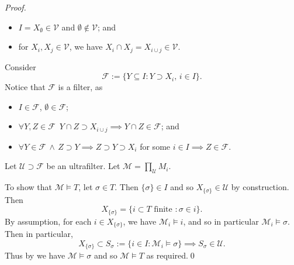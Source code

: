 \documentclass[notoc,notitlepage]{tufte-book}
\begin{document}
\begin{proof}
{\begin{itemize}
    \item $I = X_\emptyset \in \mathcal{V}$ and $\emptyset \notin \mathcal{V}$; and
    \item for $X_i, X_j \in \mathcal{V}$, we have $X_i \cap X_j = X_{i \cup j} \in \mathcal{V}$.
  \end{itemize}
  }
  Consider
  \begin{equation*}
    \mathcal{F} := \{ Y \subseteq I : Y \supset X_i, \, i \in I \}.
  \end{equation*}
  Notice that $\mathcal{F}$ is a filter, as
  \begin{itemize}
    \item $I \in \mathcal{F}$, $\emptyset \in \mathcal{F}$;
    \item $\forall Y, Z \in \mathcal{F} \enspace Y \cap Z \supset X_{i \cup j} \implies Y \cap Z \in \mathcal{F}$; and
    \item $\forall Y \in \mathcal{F} \, \land \, Z \supset Y \implies Z \supset Y \supset X_i$ for some $i \in I \implies Z \in \mathcal{F}$.
  \end{itemize}
  Let $\mathcal{U} \supset \mathcal{F}$ be an ultrafilter. Let $\mathcal{M} = \prod_{\mathcal{U}} M_i$.

  To show that $\mathcal{M} \models T$, let $\sigma \in T$. Then $\{ \sigma \} \in I$ and so $X_{\{\sigma\}} \in \mathcal{U}$ by construction. Then
  \begin{equation*}
    X_{\{\sigma\}} = \{ i \subset T \text{ finite } : \sigma \in i \}.
  \end{equation*}
  By assumption, for each $i \in X_{\{\sigma\}}$, we have $\mathcal{M}_i \models i$, and so in particular $\mathcal{M}_i \models \sigma$. Then in particular,
  \begin{equation*}
    X_{\{\sigma\}} \subset S_\sigma := \{ i \in I : \mathcal{M}_i \models \sigma \} \implies S_\sigma \in \mathcal{U}.
  \end{equation*}
  Thus by \hyperref[thm:los]{} we have $\mathcal{M} \models \sigma$ and so $\mathcal{M} \models T$ as required.\qed\
\end{proof}


\end{document}
